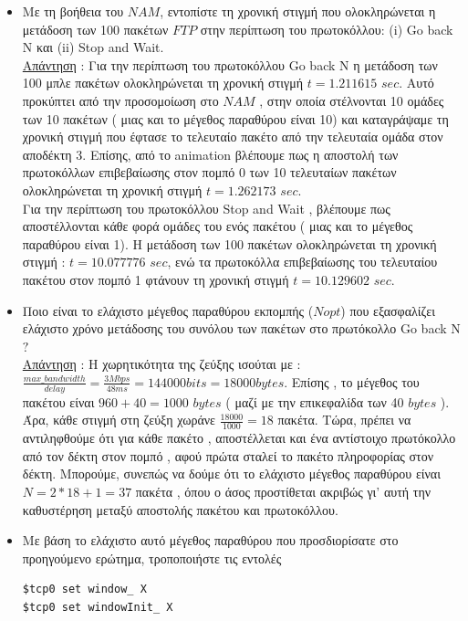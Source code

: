 \documentclass{article}%
\begin{document}
\begin{itemize}
\item Με τη βοήθεια του $NAM$, εντοπίστε τη χρονική στιγμή που ολοκληρώνεται η μετάδοση των 100
πακέτων $FTP$ στην περίπτωση του πρωτοκόλλου: (i) \textlatin{Go back N} και (ii) \textlatin{Stop and Wait}.\\
\underline{Απάντηση} : Για την περίπτωση του πρωτοκόλλου \textlatin{Go back N} η μετάδοση των 100 μπλε πακέτων ολοκληρώνεται τη χρονική στιγμή $t=1.211615$ $sec$. Αυτό προκύπτει από την προσομοίωση στο $NAM$ , στην οποία στέλνονται 10 ομάδες των 10 πακέτων ( μιας και το μέγεθος παραθύρου είναι 10) και καταγράψαμε τη χρονική στιγμή που έφτασε το τελευταίο πακέτο από την τελευταία ομάδα στον αποδέκτη 3. Επίσης, από το \textlatin{animation} βλέπουμε πως η αποστολή  των πρωτοκόλλων επιβεβαίωσης στον πομπό 0 των 10 τελευταίων πακέτων ολοκληρώνεται τη χρονική στιγμή $t=1.262173$ $sec$.\\
Για την περίπτωση του πρωτοκόλλου \textlatin{Stop and Wait} , βλέπουμε πως αποστέλλονται κάθε φορά ομάδες του ενός πακέτου ( μιας και το μέγεθος παραθύρου είναι 1). Η μετάδοση των 100 πακέτων ολοκληρώνεται τη χρονική στιγμή : $t=10.077776$ $sec$, ενώ τα πρωτοκόλλα επιβεβαίωσης του τελευταίου πακέτου στον πομπό 1 φτάνουν τη χρονική στιγμή $t=10.129602$ $sec$.
\item Ποιο είναι το ελάχιστο μέγεθος παραθύρου εκπομπής ($Nopt$) που εξασφαλίζει ελάχιστο χρόνο
μετάδοσης του συνόλου των πακέτων στο πρωτόκολλο \textlatin{Go back N} $?$\\
\underline{Απάντηση} : H χωρητικότητα της ζεύξης ισούται με : $\frac{max\_bandwidth}{delay}= \frac{3Mbps}{48ms}= 144000 bits = 18000 bytes$. Επίσης , το μέγεθος του πακέτου είναι $960+40=1000$ $bytes$ ( μαζί με την επικεφαλίδα των 40 $bytes$ ). Άρα, κάθε στιγμή στη ζεύξη χωράνε $\frac{18000}{1000}=18$ πακέτα. Τώρα, πρέπει να αντιληφθούμε ότι για κάθε πακέτο , αποστέλλεται και ένα αντίστοιχο πρωτόκολλο από τον δέκτη στον πομπό , αφού πρώτα σταλεί το πακέτο πληροφορίας στον δέκτη. Μπορούμε, συνεπώς να δούμε ότι το ελάχιστο μέγεθος παραθύρου είναι $N=2*18 + 1 = 37$ πακέτα , όπου ο άσος προστίθεται ακριβώς γι' αυτή την καθυστέρηση μεταξύ αποστολής πακέτου και πρωτοκόλλου. 
\item Με βάση το ελάχιστο αυτό μέγεθος παραθύρου που προσδιορίσατε στο προηγούμενο ερώτημα, τροποποιήστε τις εντολές
\begin{verbatim}
$tcp0 set window_ X
$tcp0 set windowInit_ X
\end{verbatim}


\end{itemize}
\end{document}
